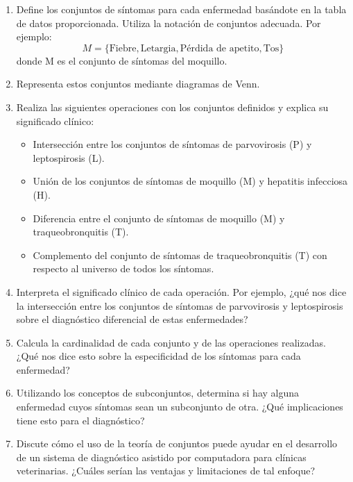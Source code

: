 \documentclass[a4,11pt]{aleph-notas}
\begin{document}
\begin{enumerate}[leftmargin=*]
    \item Define los conjuntos de síntomas para cada enfermedad basándote en la tabla de datos proporcionada. Utiliza la notación de conjuntos adecuada. Por ejemplo:
    \[M = \{\text{Fiebre}, \text{Letargia}, \text{Pérdida de apetito}, \text{Tos}\}\]
    donde M es el conjunto de síntomas del moquillo.

    \item Representa estos conjuntos mediante diagramas de Venn.

    \item Realiza las siguientes operaciones con los conjuntos definidos y explica su significado clínico:
    \begin{itemize}[leftmargin=*]
        \item Intersección entre los conjuntos de síntomas de parvovirosis (P) y leptospirosis (L).
        \item Unión de los conjuntos de síntomas de moquillo (M) y hepatitis infecciosa (H).
        \item Diferencia entre el conjunto de síntomas de moquillo (M) y traqueobronquitis (T).
        \item Complemento del conjunto de síntomas de traqueobronquitis (T) con respecto al universo de todos los síntomas.
    \end{itemize}

    \item Interpreta el significado clínico de cada operación. Por ejemplo, ¿qué nos dice la intersección entre los conjuntos de síntomas de parvovirosis y leptospirosis sobre el diagnóstico diferencial de estas enfermedades?

    \item Calcula la cardinalidad de cada conjunto y de las operaciones realizadas. ¿Qué nos dice esto sobre la especificidad de los síntomas para cada enfermedad?

    \item Utilizando los conceptos de subconjuntos, determina si hay alguna enfermedad cuyos síntomas sean un subconjunto de otra. ¿Qué implicaciones tiene esto para el diagnóstico?

    \item Discute cómo el uso de la teoría de conjuntos puede ayudar en el desarrollo de un sistema de diagnóstico asistido por computadora para clínicas veterinarias. ¿Cuáles serían las ventajas y limitaciones de tal enfoque?
\end{enumerate}
\end{document}
